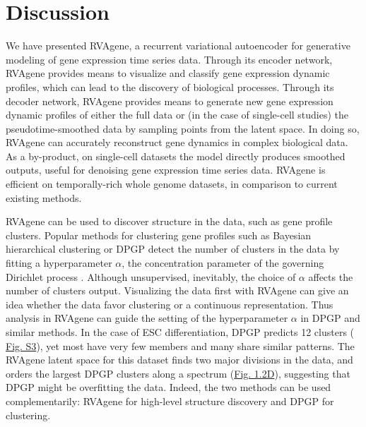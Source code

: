 %


\section{Discussion}
{We have presented RVAgene, a recurrent variational autoencoder for generative modeling of gene expression time series data.
Through its encoder network, RVAgene provides means to visualize and classify gene expression dynamic profiles, which can lead to the discovery of biological processes.
Through its decoder network, RVAgene provides means to generate new gene expression dynamic profiles of either the full data or (in the case of single-cell studies) the pseudotime-smoothed data by sampling points from the latent space. In doing so, RVAgene can accurately reconstruct gene dynamics in complex biological data. As a by-product, on single-cell datasets the model directly produces smoothed outputs, useful for denoising gene expression time series data. RVAgene is efficient on temporally-rich whole genome datasets, in comparison to current existing methods. }
\par
RVAgene can be used to discover structure in the data, such as gene profile clusters. Popular
methods for clustering gene profiles such as Bayesian hierarchical clustering
\citep{cooke2011bayesian} or DPGP \citep{McDowell2018} detect the number of clusters in the data by
fitting a hyperparameter $\alpha$, the concentration parameter of the governing Dirichlet process
\citep{ferguson1973bayesian}. Although unsupervised, inevitably, the choice of $\alpha$ affects the
number of clusters output. Visualizing the data first with RVAgene can give an idea whether the data
favor clustering or a continuous representation. Thus analysis in RVAgene can guide the setting of
the hyperparameter $\alpha$ in DPGP and similar methods. In the case of ESC differentiation, DPGP
predicts 12 clusters (\hyperref[supp]{ Fig. S3}), yet most have very few members and many share
similar patterns. The RVAgene latent space for this dataset finds two major divisions in the data,
and orders the largest DPGP clusters along a spectrum (\hyperref[fig:fig3]{Fig. 1.2D}), suggesting that DPGP might be overfitting the data. Indeed, the two methods can be used complementarily: RVAgene for high-level structure discovery and DPGP for clustering.
